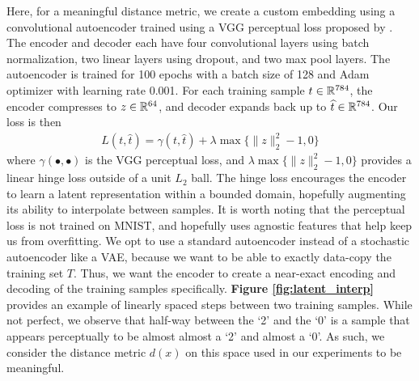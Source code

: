 Here, for a meaningful distance metric, we create a custom embedding using a convolutional autoencoder trained using a VGG perceptual loss proposed by \cite{zhang}. The encoder and decoder each have four convolutional layers using batch normalization, two linear layers using dropout, and two max pool layers. The autoencoder is trained for 100 epochs with a batch size of 128 and Adam optimizer with learning rate 0.001. For each training sample $t \in {\mathbb R}^{784}$, the encoder compresses to $z \in {\mathbb R}^{64}$, and decoder expands back up to $\widehat{t} \in {\mathbb R}^{784}$. Our loss is then 
\begin{align*}
    L(t, \widehat{t}) = \gamma(t, \widehat{t}) +  \lambda  \max \{\| z \|_2^2 - 1, 0  \}
\end{align*}
where $\gamma(\bullet, \bullet)$ is the VGG perceptual loss, and $ \lambda  \max \{\| z \|_2^2 - 1, 0  \}$ provides a linear hinge loss outside of a unit $L_2$ ball. The hinge loss encourages the encoder to learn a latent representation within a bounded domain, hopefully augmenting its ability to interpolate between samples. It is worth noting that the perceptual loss is not trained on MNIST, and hopefully uses agnostic features that help keep us from overfitting. We opt to use a standard autoencoder instead of a stochastic autoencoder like a VAE, because we want to be able to exactly data-copy the training set $T$. Thus, we want the encoder to create a near-exact encoding and decoding of the training samples specifically. \textbf{Figure \ref{fig:latent_interp}} provides an example of linearly spaced steps between two training samples. While not perfect, we observe that half-way between the `2' and the `0' is a sample that appears perceptually to be almost almost a `2' and almost a `0'. As such, we consider the distance metric $d(x)$ on this space used in our experiments to be meaningful. 

